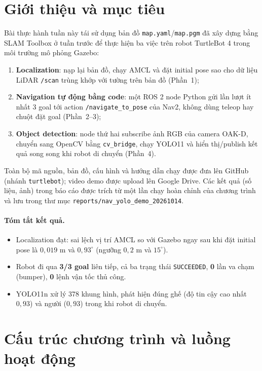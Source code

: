 \documentclass[a4paper,12pt]{article}
\begin{document}
\section{Giới thiệu và mục tiêu}
Bài thực hành tuần này tái sử dụng bản đồ \texttt{map.yaml}/\texttt{map.pgm} đã xây dựng bằng SLAM Toolbox ở tuần trước để thực hiện ba việc trên robot TurtleBot 4 trong môi trường mô phỏng Gazebo:
\begin{enumerate}[nosep]
  \item \textbf{Localization}: nạp lại bản đồ, chạy AMCL và đặt initial pose sao cho dữ liệu LiDAR \texttt{/scan} trùng khớp với tường trên bản đồ (Phần~1);
  \item \textbf{Navigation tự động bằng code}: một ROS 2 node Python gửi lần lượt ít nhất 3 goal tới action \texttt{/navigate\_to\_pose} của Nav2, không dùng teleop hay chuột đặt goal (Phần~2--3);
  \item \textbf{Object detection}: node thứ hai subscribe ảnh RGB của camera OAK-D, chuyển sang OpenCV bằng \texttt{cv\_bridge}, chạy YOLO11 và hiển thị/publish kết quả song song khi robot di chuyển (Phần~4).
\end{enumerate}
Toàn bộ mã nguồn, bản đồ, cấu hình và hướng dẫn chạy được đưa lên GitHub (nhánh \texttt{turtlebot}); video demo được upload lên Google Drive. Các kết quả (số liệu, ảnh) trong báo cáo được trích từ một lần chạy hoàn chỉnh của chương trình và lưu trong thư mục \texttt{reports/nav\_yolo\_demo\_20261014}.

\paragraph{Tóm tắt kết quả.}
\begin{itemize}[nosep]
  \item Localization đạt: sai lệch vị trí AMCL so với Gazebo ngay sau khi đặt initial pose là $0{,}019$ m và $0{,}93^\circ$ (ngưỡng $0{,}2$ m và $15^\circ$).
  \item Robot đi qua \textbf{3/3 goal} liên tiếp, cả ba trạng thái \texttt{SUCCEEDED}, \textbf{0} lần va chạm (bumper), \textbf{0} lệnh vận tốc thủ công.
  \item YOLO11n xử lý 378 khung hình, phát hiện đúng ghế (độ tin cậy cao nhất $0{,}93$) và người ($0{,}93$) trong khi robot di chuyển.
\end{itemize}

\section{Cấu trúc chương trình và luồng hoạt động}
\end{document}
